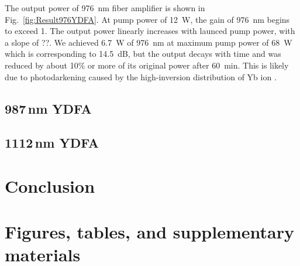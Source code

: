 \documentclass{osa-article}
\begin{document}
The output power of \SI{976}{nm} fiber amplifier is shown in Fig.~\ref{fig:Result976YDFA}.
At pump power of \SI{12}{W}, the gain of \SI{976}{nm} begins to exceed 1.
The output power linearly increases with launced pump power, with a slope of ??.
We achieved \SI{6.7}{W} of \SI{976}{nm} at maximum pump power of \SI{68}{W} which is corresponding to \SI{14.5}{dB}, but the output decays with time and was reduced by about 10\% or more of its original power after \SI{60}{\minute}.
This is likely due to photodarkening caused by the high-inversion distribution of Yb ion \cite{jetschke2007Photodarkening}.


\subsection{987\,nm YDFA}


\subsection{1112\,nm YDFA}


\section{Conclusion}

\section{Figures, tables, and supplementary materials}
\end{document}
